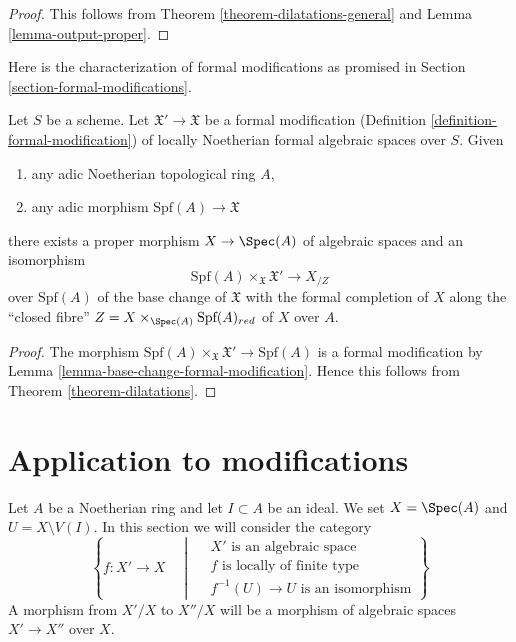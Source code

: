 \begin{proof}
This follows from Theorem \ref{theorem-dilatations-general}
and Lemma \ref{lemma-output-proper}.
\end{proof}

\noindent
Here is the characterization of formal modifications
as promised in Section \ref{section-formal-modifications}.

\begin{lemma}
\label{lemma-formal-modifications-locally-algebraic}
Let $S$ be a scheme. Let $\mathfrak X' \to \mathfrak X$
be a formal modification (Definition \ref{definition-formal-modification})
of locally Noetherian formal algebraic spaces over $S$. Given
\begin{enumerate}
\item any adic Noetherian topological ring $A$,
\item any adic morphism $\text{Spf}(A) \longrightarrow \mathfrak X$
\end{enumerate}
there exists a proper morphism $X \to \Spec(A)$ of algebraic spaces
and an isomorphism
$$
\text{Spf}(A) \times_{\mathfrak X} \mathfrak X'
\longrightarrow
X_{/Z}
$$
over $\text{Spf}(A)$ of the base change of $\mathfrak X$
with the formal completion of $X$ along the ``closed fibre''
$Z = X \times_{\Spec(A)} \text{Spf}(A)_{red}$ of $X$ over $A$.
\end{lemma}

\begin{proof}
The morphism $\text{Spf}(A) \times_{\mathfrak X} \mathfrak X'
\to \text{Spf}(A)$ is a formal modification by
Lemma \ref{lemma-base-change-formal-modification}.
Hence this follows from Theorem \ref{theorem-dilatations}.
\end{proof}







\section{Application to modifications}
\label{section-modifications}

\noindent
Let $A$ be a Noetherian ring and let $I \subset A$ be an ideal. We set
$X = \Spec(A)$ and $U = X \setminus V(I)$. In this section
we will consider the category
\begin{equation}
\label{equation-modification}
\left\{
f : X' \longrightarrow X
\quad \middle| \quad
\begin{matrix}
X'\text{ is an algebraic space}\\
f\text{ is locally of finite type}\\
f^{-1}(U) \to U\text{ is an isomorphism}
\end{matrix}
\right\}
\end{equation}
A morphism from $X'/X$ to $X''/X$ will be a morphism of algebraic spaces
$X' \to X''$ over $X$.

